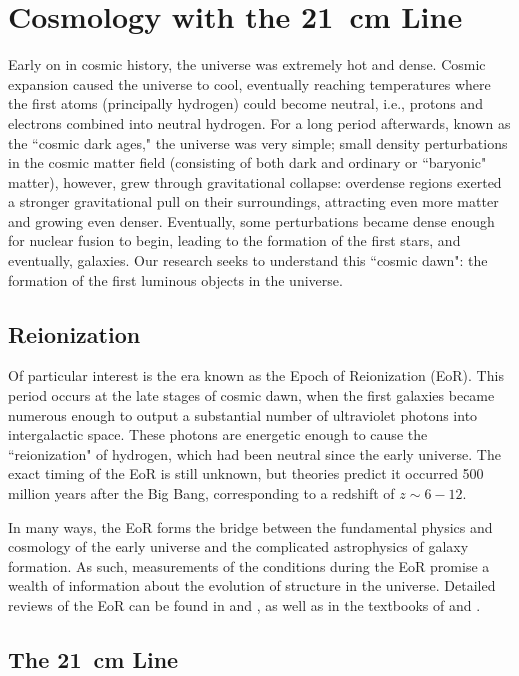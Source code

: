 \chapter{Cosmology with the 21\ cm Line}
\label{ch1}

Early on in cosmic history, the universe was extremely hot and dense.  
Cosmic expansion caused the universe to cool, 
eventually reaching temperatures where the first atoms (principally hydrogen) could become neutral,
i.e., protons and electrons combined into neutral hydrogen.
For a long period afterwards, known as the ``cosmic dark ages," the universe was very simple;
small density perturbations in the cosmic matter field (consisting of both dark
and ordinary or ``baryonic" matter), however, grew through gravitational collapse:
overdense regions exerted a stronger gravitational pull on their surroundings, attracting even more
matter and growing even denser.  Eventually, some perturbations became dense enough for
nuclear fusion to begin, leading to the formation of the first stars, and eventually, galaxies.  
Our research seeks to understand this ``cosmic dawn": 
the formation of the first luminous objects in the universe.

\section{Reionization}

Of particular interest is the era known as the Epoch of Reionization (EoR).
This period occurs at the late stages of cosmic dawn, when the first galaxies became
numerous enough to output a substantial number of ultraviolet photons into
intergalactic space.
These photons are energetic enough to cause the ``reionization" of hydrogen, which had
been neutral since the early universe.
The exact timing of the EoR is still unknown, but theories predict it occurred
500 million years after the Big Bang, corresponding to a redshift of $z \sim 6-12$.

In many ways, the EoR forms the bridge
between the fundamental physics and cosmology of the early universe
and the complicated astrophysics of galaxy formation.  As such, measurements
of the conditions during the EoR promise a wealth of information about
the evolution of structure in the universe.  Detailed reviews of the
EoR can be found in \cite{furlanetto_et_al_2006} and 
\cite{barkana_and_loeb_2007}, as well as in the textbooks of
\cite{loeb_and_furlanetto_2013} and \cite{mesinger_2016}.

\section{The 21\ cm Line}

